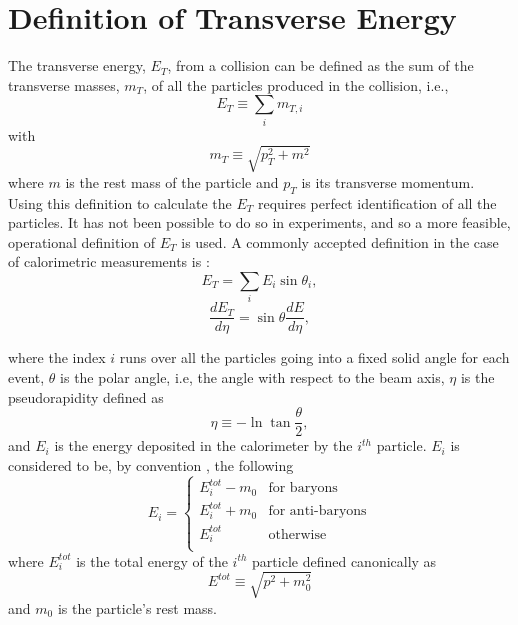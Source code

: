 \section{Definition of Transverse Energy}
The transverse energy, $E_{T}$, from a collision can be defined as the sum of the transverse masses, $m_{T}$, of all the particles produced in the collision, i.e.,
\begin{equation}\label{eqn:ETDefTheory}
E_{T}\equiv\sum_{i}m_{T,i}
\end{equation}
with
\begin{equation}\label{eqn:mT}
m_{T}\equiv\sqrt{p_{T}^{2}+m^2}
\end{equation}
where $m$ is the rest mass of the particle and $p_{T}$ is its transverse momentum. Using this definition to calculate the $E_{T}$ requires perfect identification of all the particles. It has not been possible to do so in experiments, and so a more feasible, operational definition of $E_{T}$ is used. A commonly accepted definition in the case of calorimetric measurements is \cite{PhysRevC.89.044905, PhysRevLett.109.152303}:
\begin{equation}\label{eqn:ETDefSum}
E_{T} = \sum_{i}E_{i}\sin{\theta_{i}},
\end{equation}
\begin{equation}\label{eqn:dETdEta}
\frac{dE_{T}}{d\eta}=\sin{\theta}\frac{dE}{d\eta},
\end{equation}

where the index $i$ runs over all the particles going into a fixed solid angle for each event, $\theta$ is the polar angle, i.e, the angle with respect to the beam axis, $\eta$ is the pseudorapidity defined as 
\begin{equation}\label{eqn:pseudorap}
\eta\equiv-\ln\tan{\frac{\theta}{2}},
\end{equation}
and $E_{i}$ is the energy deposited in the calorimeter by the $i^{th}$ particle. $E_{i}$ is considered to be, by convention \cite{PhysRevC.71.034908}, the following
\begin{equation}\label{eqn:EiCaseByCase}
E_{i} = 
	\begin{cases}
	E_{i}^{tot}-m_{0} & \text{for baryons} \\
	E_{i}^{tot}+m_{0} & \text{for anti-baryons} \\	
	E_{i}^{tot} & \text{otherwise} \\
	\end{cases}
\end{equation}
where $E_{i}^{tot}$ is the total energy of the $i^{th}$ particle defined canonically as
\begin{equation}\label{eqn:Etot}
E^{tot}\equiv\sqrt{p^{2}+m_{0}^2}
\end{equation}
and  $m_{0}$ is the particle's rest mass.

